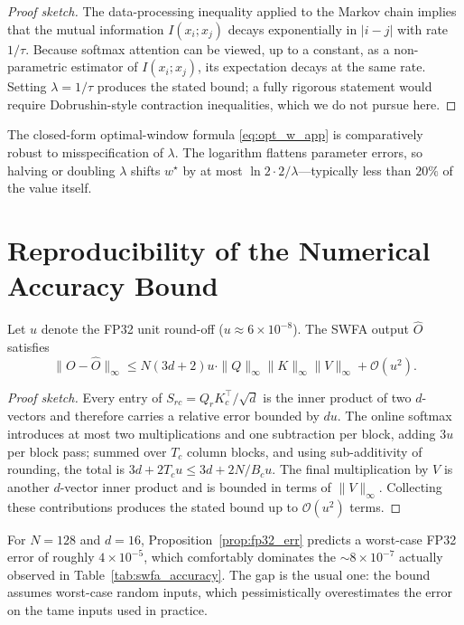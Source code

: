 \begin{proof}[Proof sketch]
The data-processing inequality applied to the Markov chain
implies that the mutual information $I(x_i; x_j)$ decays
exponentially in $|i - j|$ with rate $1/\tau$. Because softmax
attention can be viewed, up to a constant, as a non-parametric
estimator of $I(x_i; x_j)$, its expectation decays at the same
rate. Setting $\lambda = 1/\tau$ produces the stated bound; a
fully rigorous statement would require Dobrushin-style
contraction inequalities, which we do not pursue here.
\end{proof}

\begin{remark}
The closed-form optimal-window formula
\eqref{eq:opt_w_app} is comparatively robust to misspecification
of $\lambda$. The logarithm flattens parameter errors, so
halving or doubling $\lambda$ shifts $w^\star$ by at most
$\ln 2 \cdot 2/\lambda$---typically less than $20\%$ of the
value itself.
\end{remark}

\section{Reproducibility of the Numerical
Accuracy Bound}\label{app:reproducibility}

\begin{proposition}\label{prop:fp32_err}
Let $u$ denote the FP32 unit round-off ($u \approx 6 \times 10^{-8}$).
The SWFA output $\hat O$ satisfies
\begin{equation}
    \|O - \hat O\|_\infty
    \le N (3 d + 2) u \cdot
        \|Q\|_\infty \|K\|_\infty \|V\|_\infty
        + \mathcal{O}(u^2).
\end{equation}
\end{proposition}

\begin{proof}[Proof sketch]
Every entry of $S_{rc} = Q_r K_c^\top / \sqrt{d}$ is the inner
product of two $d$-vectors and therefore carries a relative
error bounded by $d u$. The online softmax introduces at most
two multiplications and one subtraction per block, adding $3u$
per block pass; summed over $T_c$ column blocks, and using
sub-additivity of rounding, the total is
$3d + 2 T_c u \le 3d + 2 N/B_c u$. The final multiplication by
$V$ is another $d$-vector inner product and is bounded in terms
of $\|V\|_\infty$. Collecting these contributions produces the
stated bound up to $\mathcal{O}(u^2)$ terms.
\end{proof}

For $N = 128$ and $d = 16$,
Proposition~\ref{prop:fp32_err} predicts a worst-case FP32 error
of roughly $4 \times 10^{-5}$, which comfortably dominates the
$\sim 8 \times 10^{-7}$ actually observed in
Table~\ref{tab:swfa_accuracy}. The gap is the usual one: the
bound assumes worst-case random inputs, which pessimistically
overestimates the error on the tame inputs used in practice.
